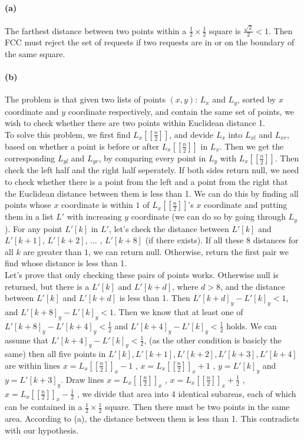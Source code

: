 \documentclass{6046}
\author{Lingfu Zhang}
\begin{document}
\paragraph{(a)}
The farthest distance between two points within a 
$\frac{1}{2}\times\frac{1}{2}$ square is 
$\frac{\sqrt{2}}{2}<1$. 
Then FCC must reject the set of requests if two requests are in or 
on the boundary of the same square. 

\paragraph{(b)}
The problem is that given two lists of points $(x,y)$: 
$L_x$ and $L_y$, sorted by $x$ coordinate and $y$ coordinate respectively, 
and contain the same set of points, 
we wish to check whether there are two points within Euclidean distance 1. 
\\

To solve this problem, we first find 
$L_x[[\frac{n}{2}]]$, 
and devide $L_x$ into $L_{xl}$ and $L_{xr}$, 
based on whether a point is before or after $L_x[[\frac{n}{2}]]$ in $L_x$. 
Then we get the corresponding $L_{yl}$ and $L_{yr}$, 
by comparing every point in  
$L_y$ with 
$L_x[[\frac{n}{2}]]$. 
Then check the left half and the right half seperately. 
If both sides return null, we need to check whether there is a point from the left 
and a point from the right that the Euclidean distance between them is less than 1. 
We can do this by finding all points whose $x$ coordinate is within $1$ 
of $L_x[[\frac{n}{2}]]$'s $x$ coordinate and putting them in a list $L'$ with 
increasing $y$ coordinate (we can do so by going through $L_y$). 
For any point $L'[k]$ in $L'$, let's check the distance between 
$L'[k]$ and $L'[k+1]$, $L'[k+2]$, ... , $L'[k+8]$ (if there exists). 
If all these $8$ distances for all $k$ are greater than $1$, 
we can return null. 
Otherwise, return the first pair we find whose distance is less than 1. 
\\

Let's prove that only checking these pairs of points works.  
Otherwise null is returned, but there is a $L'[k]$ and $L'[k+d]$, 
where $d>8$, and the distance between $L'[k]$ and $L'[k+d]$ is less than 1. 
Then $L'[k+d]_y - L'[k]_y < 1$, and 
$L'[k+8]_y - L'[k]_y < 1$. 
Then we know that at least one of 
$L'[k+8]_y - L'[k+4]_y < \frac{1}{2}$ and $L'[k+4]_y - L'[k]_y < \frac{1}{2}$
holds. 
We can assume that $L'[k+4]_y - L'[k]_y < \frac{1}{2}$, 
(as the other condition is basicly the same)
then all five points in ${L'[k], L'[k+1], L'[k+2], L'[k+3], L'[k+4]}$ are 
within lines
$x = L_x[[\frac{n}{2}]]_x - 1$ ,  $x = L_x[[\frac{n}{2}]]_x + 1$ , 
$y = L'[k]_y$ and $y = L'[k+3]_y$. 
Draw lines 
$x = L_x[[\frac{n}{2}]]_x $ ,  $x = L_x[[\frac{n}{2}]]_x + \frac{1}{2}$ , 
$x = L_x[[\frac{n}{2}]]_x - \frac{1}{2}$ , 
we divide that area into 4 identical subareas, 
each of which can be contained in a $\frac{1}{2}\times \frac{1}{2}$ square. 
Then there must be two points in the same area. 
According to (a), the distance between them is less than 1. 
This contradicts with our hypothesis. 
\\
\end{document}
